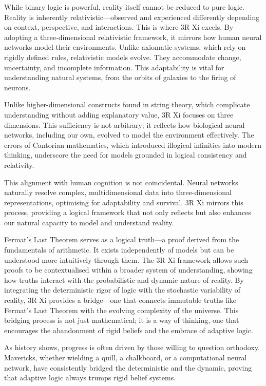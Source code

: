 \documentclass[12pt]{article}
\begin{document}
While binary logic is powerful, reality itself cannot be reduced to pure logic. Reality is inherently relativistic—observed and experienced differently depending on context, perspective, and interactions. This is where 3R Xi excels. By adopting a three-dimensional relativistic framework, it mirrors how human neural networks model their environments. Unlike axiomatic systems, which rely on rigidly defined rules, relativistic models evolve. They accommodate change, uncertainty, and incomplete information. This adaptability is vital for understanding natural systems, from the orbits of galaxies to the firing of neurons.

Unlike higher-dimensional constructs found in string theory, which complicate understanding without adding explanatory value, 3R Xi focuses on three dimensions. This sufficiency is not arbitrary; it reflects how biological neural networks, including our own, evolved to model the environment effectively. The errors of Cantorian mathematics, which introduced illogical infinities into modern thinking, underscore the need for models grounded in logical consistency and relativity.

This alignment with human cognition is not coincidental. Neural networks naturally resolve complex, multidimensional data into three-dimensional representations, optimising for adaptability and survival. 3R Xi mirrors this process, providing a logical framework that not only reflects but also enhances our natural capacity to model and understand reality.

Fermat’s Last Theorem serves as a logical truth—a proof derived from the fundamentals of arithmetic. It exists independently of models but can be understood more intuitively through them. The 3R Xi framework allows such proofs to be contextualised within a broader system of understanding, showing how truths interact with the probabilistic and dynamic nature of reality. By integrating the deterministic rigor of logic with the stochastic variability of reality, 3R Xi provides a bridge—one that connects immutable truths like Fermat’s Last Theorem with the evolving complexity of the universe. This bridging process is not just mathematical; it is a way of thinking, one that encourages the abandonment of rigid beliefs and the embrace of adaptive logic.

As history shows, progress is often driven by those willing to question orthodoxy. Mavericks, whether wielding a quill, a chalkboard, or a computational neural network, have consistently bridged the deterministic and the dynamic, proving that adaptive logic always trumps rigid belief systems.
\end{document}
